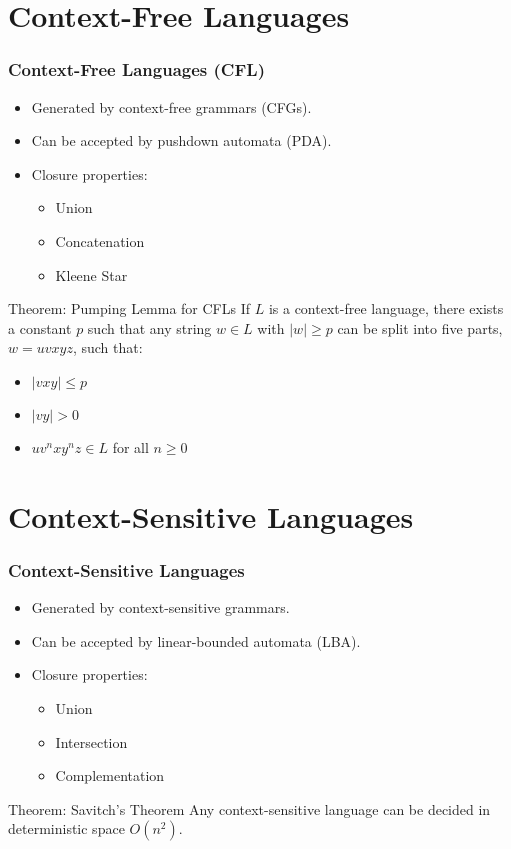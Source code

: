 \documentclass{beamer}
\begin{document}
\section{Context-Free Languages}
\begin{frame}
    \frametitle{Context-Free Languages (CFL)}
    \begin{itemize}
        \item Generated by context-free grammars (CFGs).
        \item Can be accepted by pushdown automata (PDA).
        \item Closure properties:
        \begin{itemize}
            \item Union
            \item Concatenation
            \item Kleene Star
        \end{itemize}
    \end{itemize}
    \pause
    \begin{block}{Theorem: Pumping Lemma for CFLs}
        If $L$ is a context-free language, there exists a constant $p$ such that any string $w \in L$ with $|w| \geq p$ can be split into five parts, $w = uvxyz$, such that:
        \begin{itemize}
            \item $|vxy| \leq p$
            \item $|vy| > 0$
            \item $uv^n x y^n z \in L$ for all $n \geq 0$
        \end{itemize}
    \end{block}
\end{frame}

\section{Context-Sensitive Languages}
\begin{frame}
    \frametitle{Context-Sensitive Languages}
    \begin{itemize}
        \item Generated by context-sensitive grammars.
        \item Can be accepted by linear-bounded automata (LBA).
        \item Closure properties:
        \begin{itemize}
            \item Union
            \item Intersection
            \item Complementation
        \end{itemize}
    \end{itemize}
    \pause
    \begin{block}{Theorem: Savitch's Theorem}
        Any context-sensitive language can be decided in deterministic space $O(n^2)$.
    \end{block}
\end{frame}
\end{document}
